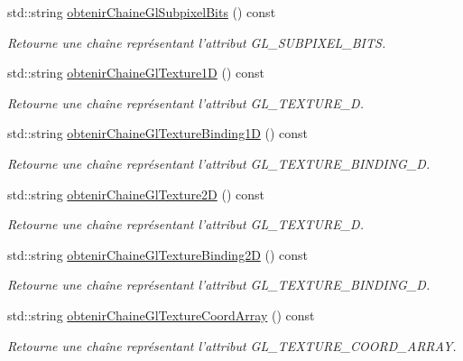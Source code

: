 \begin{DoxyCompactItemize}
std\-::string \hyperlink{group__utilitaire_ga842fdba84c1a6dc5261e2e694732df1a}{obtenir\-Chaine\-Gl\-Subpixel\-Bits} () const 
\begin{DoxyCompactList}\small\item\em Retourne une chaîne représentant l'attribut G\-L\-\_\-\-S\-U\-B\-P\-I\-X\-E\-L\-\_\-\-B\-I\-T\-S. \end{DoxyCompactList}\item 
std\-::string \hyperlink{group__utilitaire_ga60712e8970d469ba28a61541933011c4}{obtenir\-Chaine\-Gl\-Texture1\-D} () const 
\begin{DoxyCompactList}\small\item\em Retourne une chaîne représentant l'attribut G\-L\-\_\-\-T\-E\-X\-T\-U\-R\-E\-\_\-D. \end{DoxyCompactList}\item 
std\-::string \hyperlink{group__utilitaire_ga6ef71bae62c28f023f69aa0838ef1b31}{obtenir\-Chaine\-Gl\-Texture\-Binding1\-D} () const 
\begin{DoxyCompactList}\small\item\em Retourne une chaîne représentant l'attribut G\-L\-\_\-\-T\-E\-X\-T\-U\-R\-E\-\_\-\-B\-I\-N\-D\-I\-N\-G\-\_\-D. \end{DoxyCompactList}\item 
std\-::string \hyperlink{group__utilitaire_ga9c4d303e8a354ddb4678796eaceb45c6}{obtenir\-Chaine\-Gl\-Texture2\-D} () const 
\begin{DoxyCompactList}\small\item\em Retourne une chaîne représentant l'attribut G\-L\-\_\-\-T\-E\-X\-T\-U\-R\-E\-\_\-D. \end{DoxyCompactList}\item 
std\-::string \hyperlink{group__utilitaire_ga308bae30bed330cc281e0f2443cb43d2}{obtenir\-Chaine\-Gl\-Texture\-Binding2\-D} () const 
\begin{DoxyCompactList}\small\item\em Retourne une chaîne représentant l'attribut G\-L\-\_\-\-T\-E\-X\-T\-U\-R\-E\-\_\-\-B\-I\-N\-D\-I\-N\-G\-\_\-D. \end{DoxyCompactList}\item 
std\-::string \hyperlink{group__utilitaire_ga6e3e42a091a09f20c4885d62bd29d1fb}{obtenir\-Chaine\-Gl\-Texture\-Coord\-Array} () const 
\begin{DoxyCompactList}\small\item\em Retourne une chaîne représentant l'attribut G\-L\-\_\-\-T\-E\-X\-T\-U\-R\-E\-\_\-\-C\-O\-O\-R\-D\-\_\-\-A\-R\-R\-A\-Y. \end{DoxyCompactList}\item 

\end{DoxyCompactItemize}
